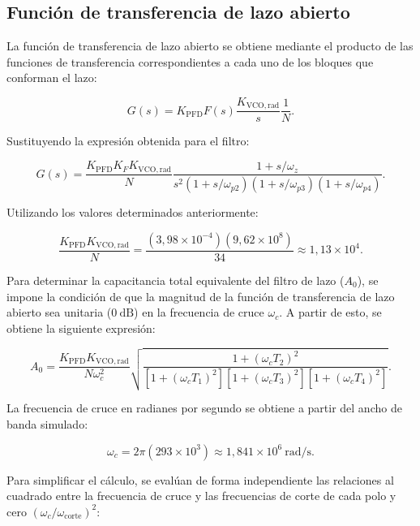 \subsection*{Función de transferencia de lazo abierto}
La función de transferencia de lazo abierto se obtiene mediante el producto de las funciones de transferencia correspondientes a cada uno de los bloques que conforman el lazo:

\begin{equation}
G(s) = K_{\mathrm{PFD}} F(s) \frac{K_{\mathrm{VCO,rad}}}{s} \frac{1}{N}.
\end{equation}

Sustituyendo la expresión obtenida para el filtro:

\begin{equation}
G(s) = \frac{K_{\mathrm{PFD}} K_F K_{\mathrm{VCO,rad}}}{N} \frac{1 + s/\omega_z}{s^2 \left(1 + s/\omega_{p2}\right) \left(1 + s/\omega_{p3}\right) \left(1 + s/\omega_{p4}\right)}.
\end{equation}

Utilizando los valores determinados anteriormente:

\begin{equation}
\frac{K_{\mathrm{PFD}} K_{\mathrm{VCO,rad}}}{N} = \frac{(3{,}98\times10^{-4})(9{,}62\times10^8)}{34} \approx 1{,}13\times10^4.
\end{equation}

Para determinar la capacitancia total equivalente del filtro de lazo ($A_0$), se impone la condición de que la magnitud de la función de transferencia de lazo abierto sea unitaria ($0~\mathrm{dB}$) en la frecuencia de cruce $\omega_c$. A partir de esto, se obtiene la siguiente expresión:

\begin{equation}
A_0 = \frac{K_{\mathrm{PFD}} K_{\mathrm{VCO,rad}}}{N \omega_c^2} \sqrt{\frac{1 + (\omega_c T_2)^2}{\left[1 + (\omega_c T_1)^2\right] \left[1 + (\omega_c T_3)^2\right] \left[1 + (\omega_c T_4)^2\right]}}.
\end{equation}

La frecuencia de cruce en radianes por segundo se obtiene a partir del ancho de banda simulado:

\begin{equation}
\omega_c = 2\pi (293\times10^3) \approx 1{,}841\times10^6~\mathrm{rad/s}.
\end{equation}

Para simplificar el cálculo, se evalúan de forma independiente las relaciones al cuadrado entre la frecuencia de cruce y las frecuencias de corte de cada polo y cero $(\omega_c / \omega_{\mathrm{corte}})^2$:

